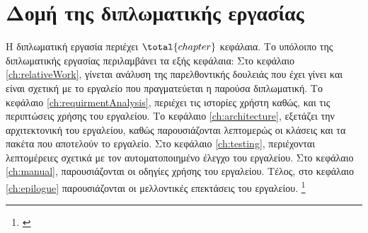 \section{Δομή της διπλωματικής εργασίας}
\label{sec:Structure}
Η διπλωματική εργασία περιέχει $\total{chapter}$ κεφάλαια. Το υπόλοιπο της  διπλωματικής  εργασίας  περιλαμβάνει τα εξής κεφάλαια:
Στο κεφάλαιο \ref{ch:relativeWork}, γίνεται ανάλυση της παρελθοντικής δουλειάς που έχει γίνει και είναι σχετική με
το εργαλείο που πραγματεύεται η παρούσα διπλωματική. Το κεφάλαιο \ref{ch:requirmentAnalysis}, περιέχει τις ιστορίες χρήστη
καθώς, και τις περιπτώσεις χρήσης του εργαλείου. 
Το κεφάλαιο \ref{ch:architecture}, εξετάζει την αρχιτεκτονική του εργαλείου, 
καθώς παρουσιάζονται λεπτομερώς οι κλάσεις και τα πακέτα που αποτελούν το εργαλείο. Στο κεφάλαιο \ref{ch:testing}, περιέχονται 
λεπτομέρειες σχετικά με τον αυτοματοποιημένο έλεγχο του εργαλείου. Στο κεφάλαιο \ref{ch:manual}, παρουσιάζονται 
οι οδηγίες χρήσης του εργαλείου. Τέλος, στο κεφάλαιο \ref{ch:epilogue} παρουσιάζονται οι μελλοντικές επεκτάσεις του εργαλείου.
\footnote{\cite{GoF}}